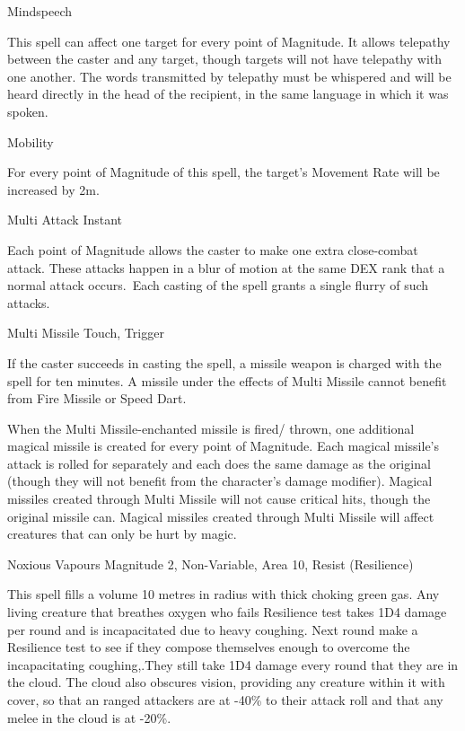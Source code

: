 \begin{rpg-spell}
{Mindspeech}
{}

This spell can affect one target for every point of Magnitude. It allows telepathy between the caster and any target, though targets will not have telepathy with one another. The words transmitted by telepathy must be whispered and will be heard directly in the head of the recipient, in the same language in which it was spoken. 
\end{rpg-spell}


\begin{rpg-spell}
{Mobility}
{}

For every point of Magnitude of this spell, the target’s Movement Rate will be increased by 2m.
\end{rpg-spell}


\begin{rpg-spell}
{Multi Attack}
{Instant}

Each point of Magnitude allows the caster to make one extra close-combat attack. These attacks happen in a blur of motion at the same DEX rank that a normal attack occurs. Each casting of the spell grants a single flurry of such attacks.
\end{rpg-spell}


\begin{rpg-spell}
{Multi Missile}
{Touch, Trigger}

If the caster succeeds in casting the spell, a missile weapon is charged with the spell for ten minutes. A missile under the effects of Multi Missile cannot benefit from Fire Missile or Speed Dart. 

When the Multi Missile-enchanted missile is fired/ thrown, one additional magical missile is created for every point of Magnitude. Each magical missile’s attack is rolled for separately and each does the same damage as the original (though they will not benefit from the character’s damage modifier). Magical missiles created through Multi Missile will not cause critical hits, though the original missile can. Magical missiles created through Multi Missile will affect creatures that can only be hurt by magic. 
\end{rpg-spell}


\begin{rpg-spell}
{Noxious Vapours}
{Magnitude 2, Non-Variable, Area 10, Resist (Resilience)}

This spell fills a volume 10 metres in radius with thick choking green gas. Any living creature that breathes oxygen who fails Resilience test takes 1D4 damage per round and is incapacitated due to heavy coughing. Next round make a Resilience test to see if they compose themselves enough to overcome the incapacitating coughing,.They still take 1D4 damage every round that they are in the cloud. The cloud also obscures vision, providing any creature within it with cover, so that an ranged attackers are at -40\% to their attack roll and that any melee in the cloud is at -20\%.
\end{rpg-spell}


